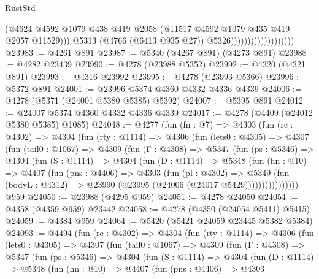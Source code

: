 \begin{lexlean}{RustStd}
\begin{coremodule}
                                            (@4624
                                              @4592
                                              @1079
                                              @438
                                              @419
                                              @2058
                                              (@11517 @4592 @1079 @435 @419 @2057 @11529)))
                                          @5313
                                          (@4766 (@6413 @935 @27))
                                          @5326)))))))))))))))))))
@23983 := @4261 @891
@23987 := @5340 (@4267 @891) (@4273 @891)
@23988 := @4282 @23439
@23990 := @4278 (@23988 @5352)
@23992 := @4320 (@4321 @891)
@23993 := @4316 @23992
@23995 := @4278 (@23993 @5366)
@23996 := @5372 @891
@24001 := @23996 @5374 @4360 @4332 @4336 @4339
@24006 := @4278 (@5371 (@24001 @5380 @5385) @5392)
@24007 := @5395 @891
@24012 := @24007 @5374 @4360 @4332 @4336 @4339
@24017 := @4278 (@4409 (@24012 @5380 @5385) @1085)
@24048 := @4277
    (fun (fn : @7) =>
    @4303
      (fun (rc : @4302) =>
      @4304
        (fun (rty : @1114) =>
        @4306
          (fun (lets0 : @4305) =>
          @4307
            (fun (tail0 : @1067) =>
            @4309
              (fun (Γ : @4308) =>
              @5347
                (fun (ps : @5346) =>
                @4304
                  (fun (S : @1114) =>
                  @4304
                    (fun (D : @1114) =>
                    @5348
                      (fun (hn : @10) =>
                      @4407
                        (fun (pns : @4406) =>
                        @4303
                          (fun (pl : @4302) =>
                          @5349
                            (fun (bodyL : @4312) =>
                            @23990 (@23995 (@24006 (@24017 @5429))))))))))))))))
    @959
@24050 := @23988 (@4295 @959)
@24051 := @4278 @24050
@24054 := @4358 (@4359 @959) @23442
@24058 := @4278 (@4350 (@24054 @5411) @5415)
@24059 := @4384 @959
@24064 := @5420 (@5421 @24059 @23445 @5382 @5384)
@24093 := @4494
    (fun (rc : @4302) =>
    @4304
      (fun (rty : @1114) =>
      @4306
        (fun (lets0 : @4305) =>
        @4307
          (fun (tail0 : @1067) =>
          @4309
            (fun (Γ : @4308) =>
            @5347
              (fun (ps : @5346) =>
              @4304
                (fun (S : @1114) =>
                @4304
                  (fun (D : @1114) =>
                  @5348
                    (fun (hn : @10) =>
                    @4407
                      (fun (pns : @4406) =>
                      @4303

\end{coremodule}
\end{lexlean}
